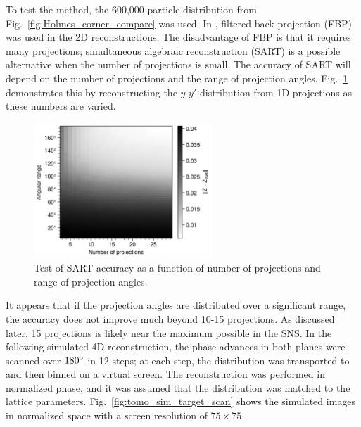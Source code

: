 To test the method, the 600,000-particle distribution from Fig.~\ref{fig:Holmes_corner_compare} was used. In \cite{Hock2013a}, filtered back-projection (FBP) was used in the 2D reconstructions. The disadvantage of FBP is that it requires many projections; simultaneous algebraic reconstruction (SART) is a possible alternative when the number of projections is small. The accuracy of SART will depend on the number of projections and the range of projection angles. Fig.~\ref{fig:tomo_sim_art2D} demonstrates this by reconstructing the $y$-$y'$ distribution from 1D projections as these numbers are varied.
%
\begin{figure}[!p]
    \centering
    \vspace*{3.0cm}
    \includegraphics[width=0.6\textwidth]{Images/chapter4/tomo_sim_art2d.png}
    \caption{Test of SART accuracy as a function of number of projections and range of projection angles.}
    \label{fig:tomo_sim_art2D}
    \vspace*{3.0cm}
\end{figure}
%
It appears that if the projection angles are distributed over a significant range, the accuracy does not improve much beyond 10-15 projections. As discussed later, 15 projections is likely near the maximum possible in the SNS. In the following simulated 4D reconstruction, the phase advances in both planes were scanned over $180\degree$ in 12 steps; at each step, the distribution was transported to and then binned on a virtual screen. The reconstruction was performed in normalized phase, and it was assumed that the distribution was matched to the lattice parameters. Fig.~\ref{fig:tomo_sim_target_scan} shows the simulated images in normalized space with a screen resolution of $75 \times 75$.
%
